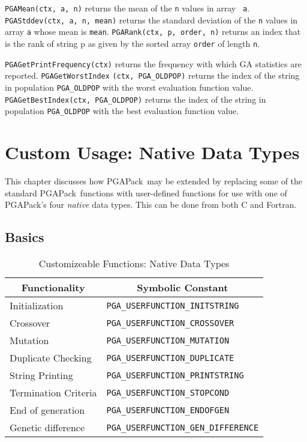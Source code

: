 \documentclass{report}
\newcommand{\pga}{PGAPack}
\begin{document}
{\tt PGAMean(ctx, a, n)} returns the mean of the {\tt n} values in array {\tt
a}. {\tt PGAStddev(ctx, a, n, mean)} returns the standard deviation of the
{\tt n} values in array {\tt a} whose mean is {\tt mean}.  {\tt PGARank(ctx,
p, order, n)} returns an index that is the rank of string p as given by the
sorted array {\tt order} of length {\tt n}.

\begin{sloppypar}
{\tt PGAGetPrintFrequency(ctx)} returns the frequency with which GA statistics
are reported. {\tt PGAGetWorstIndex} {\tt (ctx, PGA\_OLDPOP)} returns the
index of the string in population {\tt PGA\_OLDPOP} with the worst evaluation
function value.  {\tt PGAGetBestIndex(ctx, PGA\_OLDPOP)} returns the index of
the string in population {\tt PGA\_OLDPOP} with the best evaluation function
value.
\end{sloppypar}


\chapter{Custom Usage: Native Data Types}\label{chp:custom1}

This chapter discusses how \pga\ may be extended by replacing some of the
standard \pga\ functions with user-defined functions for use with one of
\pga's four {\em native}  data types.  This can be done from both C and
Fortran. 

\section{Basics}

\begin{table}
\centering
\caption
{Customizeable Functions: Native Data Types\label{tab:custom-functions1} }
\begin{tabular}{|l|l|} \hline\hline
\multicolumn{1}{|c|}{Functionality} &
\multicolumn{1}{c|}{Symbolic Constant} \\ \hline
Initialization       & \verb+PGA_USERFUNCTION_INITSTRING+ \\
Crossover            & \verb+PGA_USERFUNCTION_CROSSOVER+ \\
Mutation             & \verb+PGA_USERFUNCTION_MUTATION+ \\
Duplicate Checking   & \verb+PGA_USERFUNCTION_DUPLICATE+ \\
String Printing      & \verb+PGA_USERFUNCTION_PRINTSTRING+ \\
Termination Criteria & \verb+PGA_USERFUNCTION_STOPCOND+ \\
End of generation    & \verb+PGA_USERFUNCTION_ENDOFGEN+ \\
Genetic difference   & \verb+PGA_USERFUNCTION_GEN_DIFFERENCE+ \\
\hline
\end{tabular}
\end{table}
\end{document}
